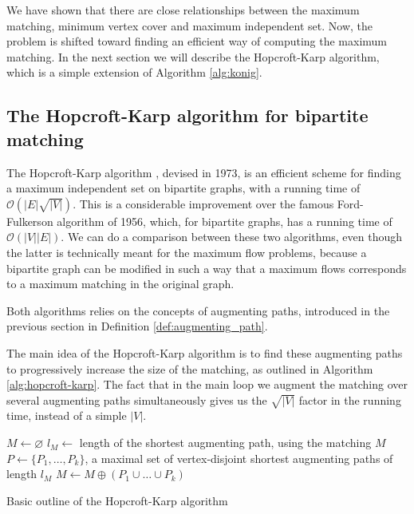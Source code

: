 We have shown that there are close relationships between the maximum matching, minimum vertex cover and maximum independent set. Now, the problem is shifted toward finding an efficient way of computing the maximum matching. In the next section we will describe the Hopcroft-Karp algorithm, which is a simple extension of Algorithm \ref{alg:konig}.

\subsection{The Hopcroft-Karp algorithm for bipartite matching}

The Hopcroft-Karp algorithm \cite{hopcroft_karp}, devised in 1973, is an efficient scheme for finding a maximum independent set on bipartite graphs, with a running time of $\mathcal{O}\left( |E|\sqrt{|V|} \right)$. This is a considerable improvement over the famous Ford-Fulkerson algorithm of 1956, which, for bipartite graphs, has a running time of $\mathcal{O}\left( |V||E| \right)$. We can do a comparison between these two algorithms, even though the latter is technically meant for the maximum flow problems, because a bipartite graph can be modified in such a way that a maximum flows corresponds to a maximum matching in the original graph.

Both algorithms relies on the concepts of augmenting paths, introduced in the previous section in Definition \ref{def:augmenting_path}.

The main idea of the Hopcroft-Karp algorithm is to find these augmenting paths to progressively increase the size of the matching, as outlined in Algorithm \ref{alg:hopcroft-karp}. The fact that in the main loop we augment the matching over several augmenting paths simultaneously gives us the $\sqrt{|V|}$ factor in the running time, instead of a simple $|V|$.

\begin{algorithm}[h]
	\begin{algorithmic}
		\State $M \gets \varnothing$
		\Repeat
		\State $l_M \gets$ length of the shortest augmenting path, using the matching $M$
		\State $P \gets \{ P_1,\dots,P_k \}$, a maximal set of vertex-disjoint shortest augmenting paths of length $l_M$
		\State $M \gets M \oplus (P_1 \cup \dots \cup P_k )$
	\end{algorithmic}
	\caption{Basic outline of the Hopcroft-Karp algorithm} \label{alg:hopcroft-karp}
\end{algorithm}

